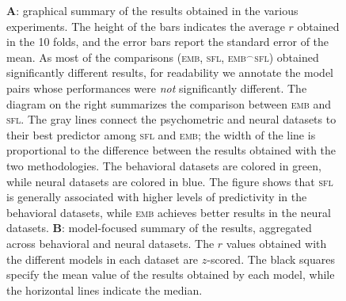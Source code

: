 \begin{figure}[htp]
\begin{center}
{\begin{tikzpicture}
\end{tikzpicture}}
\end{center}
\caption{\textbf{A}: graphical summary of the results obtained in the various experiments. The height of the bars indicates the average $r$ obtained in the 10 folds, and the error bars report the standard error of the mean. As most of the comparisons (\textsc{emb}, \textsc{sfl}, \textsc{emb}$^\frown$\textsc{sfl}) obtained significantly different results, for readability we annotate the model pairs whose performances were \textit{not} significantly different. The diagram on the right summarizes the comparison between \textsc{emb} and \textsc{sfl}. The gray lines connect the psychometric and neural datasets to their best predictor among \textsc{sfl} and \textsc{emb}; the width of the line is proportional to the difference between the results obtained with the two methodologies. The behavioral datasets are colored in green, while neural datasets are colored in blue. The figure shows that \textsc{sfl} is generally associated with higher levels of predictivity in the behavioral datasets, while \textsc{emb} achieves better results in the neural datasets. \textbf{B}: model-focused summary of the results, aggregated across behavioral and neural datasets. The $r$ values obtained with the different models in each dataset are $z$-scored. The black squares specify the mean value of the results obtained by each model, while the horizontal lines indicate the median. }
\label{fig:results}

\end{figure}
